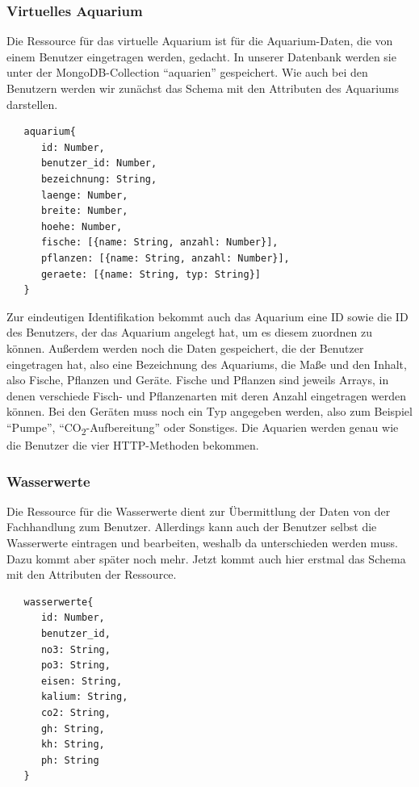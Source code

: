 \subsubsection{Virtuelles Aquarium}

Die Ressource für das virtuelle Aquarium ist für die Aquarium-Daten, die von einem Benutzer eingetragen werden, gedacht. In unserer Datenbank werden sie unter der MongoDB-Collection ``aquarien'' gespeichert. Wie auch bei den Benutzern werden wir zunächst das Schema mit den Attributen des Aquariums darstellen.

\begin{lstlisting}
   aquarium{
      id: Number,
      benutzer_id: Number,
      bezeichnung: String,
      laenge: Number,
      breite: Number,
      hoehe: Number,
      fische: [{name: String, anzahl: Number}],
      pflanzen: [{name: String, anzahl: Number}],
      geraete: [{name: String, typ: String}]
   }
\end{lstlisting}

Zur eindeutigen Identifikation bekommt auch das Aquarium eine ID sowie die ID des Benutzers, der das Aquarium angelegt hat, um es diesem zuordnen zu können. Außerdem werden noch die Daten gespeichert, die der Benutzer eingetragen hat, also eine Bezeichnung des Aquariums, die Maße und den Inhalt, also Fische, Pflanzen und Geräte. Fische und Pflanzen sind jeweils Arrays, in denen verschiede Fisch- und Pflanzenarten mit deren Anzahl eingetragen werden können. Bei den Geräten muss noch ein Typ angegeben werden, also zum Beispiel ``Pumpe'', ``CO\textsubscript{2}-Aufbereitung'' oder Sonstiges. Die Aquarien werden genau wie die Benutzer die vier HTTP-Methoden bekommen. 

\subsubsection{Wasserwerte}

Die Ressource für die Wasserwerte dient zur Übermittlung der Daten von der Fachhandlung zum Benutzer. Allerdings kann auch der Benutzer selbst die Wasserwerte eintragen und bearbeiten, weshalb da unterschieden werden muss. Dazu kommt aber später noch mehr. Jetzt kommt auch hier erstmal das Schema mit den Attributen der Ressource.

\begin{lstlisting}
   wasserwerte{
      id: Number,
      benutzer_id,
      no3: String,
      po3: String,
      eisen: String,
      kalium: String,
      co2: String,
      gh: String,
      kh: String,
      ph: String
   }
\end{lstlisting}

